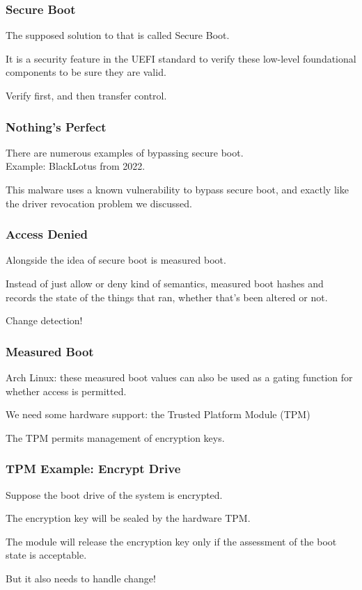 \begin{frame}
\frametitle{Secure Boot}

The supposed solution to that is called \alert{Secure Boot}.

It is a security feature in the UEFI standard to verify these low-level foundational components to be sure they are valid.


Verify first, and then transfer control.

\end{frame}

\begin{frame}
\frametitle{Nothing's Perfect}

There are numerous examples of bypassing secure boot.\\
\quad Example: BlackLotus from 2022. 

This malware uses a known vulnerability to bypass secure boot, and exactly like the driver revocation problem we discussed.

\end{frame}


\begin{frame}
\frametitle{Access Denied}

Alongside the idea of secure boot is \alert{measured boot}. 

Instead of just allow or deny kind of semantics, measured boot hashes and records the state of the things that ran, whether that's been altered or not.

Change detection!

\end{frame}


\begin{frame}
\frametitle{Measured Boot}

Arch Linux: these measured boot values can also be used as a gating function for whether access is permitted. 

We need some hardware support: the \alert{Trusted Platform Module (TPM)}


The TPM permits management of encryption keys.

\end{frame}


\begin{frame}
\frametitle{TPM Example: Encrypt Drive}

Suppose the boot drive of the system is encrypted. 

The encryption key will be sealed by the hardware TPM.

The module will release the encryption key only if the assessment of the boot state is acceptable.

But it also needs to handle change!

\end{frame}


